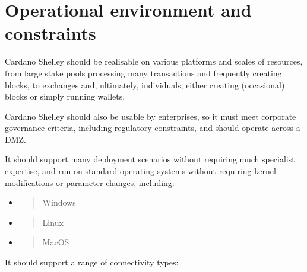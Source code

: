 \documentclass[11pt,a4paper]{article}
\begin{document}
\section{Operational environment and constraints}
\label{operational-environment-and-constraints}

Cardano Shelley should be realisable on various platforms and scales of
resources, from large stake pools processing many transactions and
frequently creating blocks, to exchanges and, ultimately, individuals,
either creating (occasional) blocks or simply running wallets.

Cardano Shelley should also be usable by enterprises, so it must meet
corporate governance criteria, including regulatory constraints, and
should operate across a DMZ.

It should support many deployment scenarios without requiring much
specialist expertise, and run on standard operating systems without
requiring kernel modifications or parameter changes, including:

\begin{itemize}
\item
  \begin{quote}
  Windows
  \end{quote}
\item
  \begin{quote}
  Linux
  \end{quote}
\item
  \begin{quote}
  MacOS
  \end{quote}
\end{itemize}

It should support a range of connectivity types:
\end{document}
